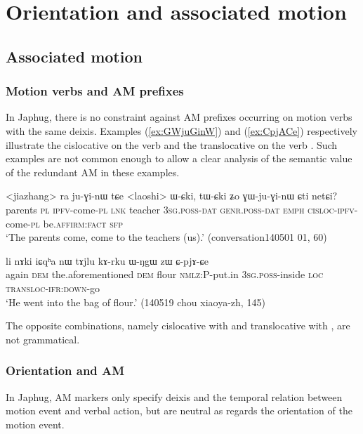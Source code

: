 \chapter{Orientation and associated motion}
\section{Associated motion}

\subsection{Motion verbs and AM prefixes}
In Japhug, there is no constraint against AM prefixes occurring on motion verbs with the same deixis. Examples (\ref{ex:GWjuGinW}) and (\ref{ex:CpjACe}) respectively illustrate the cislocative on the verb  and the translocative on the verb . Such examples are not common enough to allow a clear analysis of the semantic value of the redundant AM in these examples.

\begin{exe}
\ex \label{ex:GWjuGinW}
 \gll <jiazhang> ra ju-ɣi-nɯ tɕe <laoshi> ɯ-ɕki, tɯ-ɕki ʑo ɣɯ-ju-ɣi-nɯ ɕti netɕi? \\
 parents \textsc{pl} \textsc{ipfv}-come-\textsc{pl} \textsc{lnk} teacher \textsc{3sg}.\textsc{poss}-\textsc{dat} \textsc{genr}.\textsc{poss}-\textsc{dat} \textsc{emph} \textsc{cisloc}-\textsc{ipfv}-come-\textsc{pl} be.\textsc{affirm}:\textsc{fact} \textsc{sfp} \\
 \glt `The parents come, come to the teachers (us).' (conversation140501 01, 60)
\end{exe}

\begin{exe}
\ex \label{ex:CpjACe}
 \gll li nɤki iɕqʰa nɯ tɤjlu kɤ-rku ɯ-ŋgɯ zɯ ɕ-pjɤ-ɕe \\
 again \textsc{dem} the.aforementioned \textsc{dem} flour \textsc{nmlz}:P-put.in \textsc{3sg}.\textsc{poss}-inside \textsc{loc} \textsc{transloc}-\textsc{ifr}:\textsc{down}-go \\
 \glt `He went into the bag of flour.' (140519 chou xiaoya-zh, 145)
\end{exe}

The opposite combinations, namely cislocative with  and translocative with , are not grammatical. 

\subsection{Orientation and AM}
In Japhug, AM markers only specify deixis and the temporal relation between motion event and verbal action, but are neutral as regards the orientation of the motion event.

